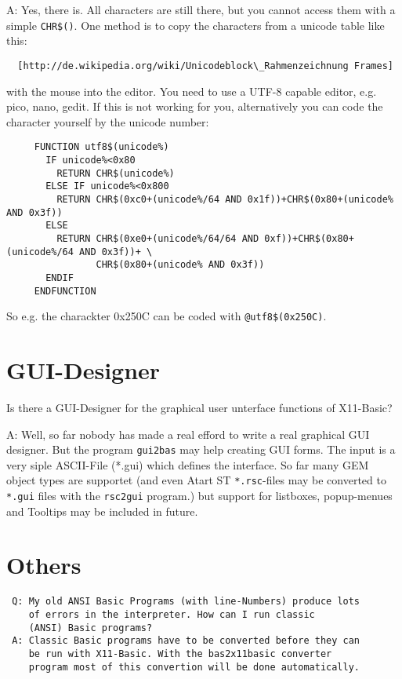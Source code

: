   A: Yes, there is. All characters are still there, but you cannot 
     access them with a simple \verb|CHR$()|. One method is to 
     copy the characters from a unicode table like this: 
{\footnotesize\begin{verbatim}
  [http://de.wikipedia.org/wiki/Unicodeblock\_Rahmenzeichnung Frames] 
\end{verbatim} }
     with the mouse into the editor. 
     You need to use a UTF-8 capable editor, e.g. pico, nano, gedit.
     If this is not working for you, alternatively you can code the 
     character yourself by the unicode number:

  {\footnotesize\begin{verbatim}
     FUNCTION utf8$(unicode%)
       IF unicode%<0x80
         RETURN CHR$(unicode%)
       ELSE IF unicode%<0x800
         RETURN CHR$(0xc0+(unicode%/64 AND 0x1f))+CHR$(0x80+(unicode% AND 0x3f))
       ELSE
         RETURN CHR$(0xe0+(unicode%/64/64 AND 0xf))+CHR$(0x80+(unicode%/64 AND 0x3f))+ \
                CHR$(0x80+(unicode% AND 0x3f))  
       ENDIF
     ENDFUNCTION
 \end{verbatim} }

     So e.g. the charackter 0x250C can be coded with \verb|@utf8$(0x250C)|.


\section*{GUI-Designer}
Is there a GUI-Designer for the graphical user unterface functions of X11-Basic?

 A: Well, so far nobody has made a real efford to write a real graphical  GUI designer.
    But the program \verb|gui2bas| may help creating GUI forms.  The input is a very siple
    ASCII-File (*.gui) which defines the interface.  So far many GEM object types are
    supportet (and even Atart ST \verb|*.rsc|-files  may be converted to \verb|*.gui|
    files with the \verb|rsc2gui| program.) but support for listboxes, popup-menues and
    Tooltips may be included in future.

\section*{Others}
\begin{verbatim}
 Q: My old ANSI Basic Programs (with line-Numbers) produce lots 
    of errors in the interpreter. How can I run classic 
    (ANSI) Basic programs?
 A: Classic Basic programs have to be converted before they can 
    be run with X11-Basic. With the bas2x11basic converter 
    program most of this convertion will be done automatically. 
\end{verbatim}


